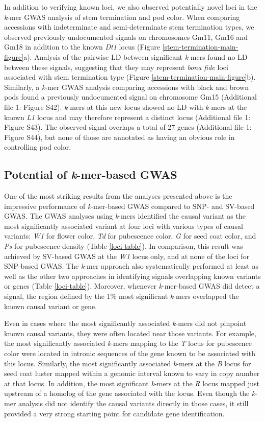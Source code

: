\documentclass[doublespacing]{bmcart}
\begin{document}
In addition to verifying known loci, we also observed potentially novel loci in
the \textit{k}-mer GWAS analysis of stem termination and pod color.  When
comparing accessions with indeterminate and semi-determinate stem termination
types, we observed previously undocumented signals on chromosomes Gm11, Gm16
and Gm18 in addition to the known \textit{Dt1} locus (Figure
\ref{stem-termination-main-figure}a).  Analysis of the pairwise LD between
significant \textit{k}-mers found no LD between these signals, suggesting that
they may represent \textit{bona fide} loci associated with stem termination
type (Figure \ref{stem-termination-main-figure}b). Similarly, a \textit{k}-mer
GWAS analysis comparing accessions with black and brown pods found a previously
undocumented signal on chromosome Gm15 (Additional file 1: Figure S42).
\textit{k}-mers at this new locus
showed no LD with \textit{k}-mers at the known \textit{L1} locus and may
therefore represent a distinct locus (Additional file 1: Figure 
S43). The observed signal overlaps a total of 27 genes
(Additional file 1: Figure S44), but none of those are annotated
as having an obvious role in controlling pod color.

\subsection*{Potential of \emph{k}-mer-based GWAS}

One of the most striking results from the analyses presented above is the
impressive performance of \emph{k}-mer-based GWAS compared to SNP- and SV-based
GWAS. The GWAS analyses using \emph{k}-mers identified the causal variant as
the most significantly associated variant at four loci with various types of
causal variants: \emph{W1} for flower color, \emph{Td} for pubescence color,
\emph{G} for seed coat color, and \emph{Ps} for pubescence density (Table
\ref{loci-table}). In comparison, this result was achieved by SV-based GWAS at
the \textit{W1} locus only, and at none of the loci for SNP-based GWAS.
The \textit{k}-mer approach also systematically performed at least as well as
the other two approaches in identifying signals overlapping known variants or
genes (Table \ref{loci-table}). Moreover, whenever \textit{k}-mer-based GWAS
did detect a signal, the region defined by the 1\% most significant
\textit{k}-mers overlapped the known causal variant or gene. 

Even in cases where the most significantly associated \emph{k}-mers did not
pinpoint known causal variants, they were often located near those variants.
For example, the most significantly associated \emph{k}-mers mapping to the
\emph{T} locus for pubescence color were located in intronic sequences of the
gene known to be associated with this locus.  Similarly, the most significantly
associated \emph{k}-mers at the \emph{B} locus for seed coat luster mapped
within a genomic interval known to vary in copy number at that locus. In
addition, the most significant \emph{k}-mers at the \emph{R} locus mapped just
upstream of a homolog of the gene associated with the locus. Even though the
\emph{k}-mer analysis did not identify the causal variants directly in those
cases, it still provided a very strong starting point for candidate gene
identification.
\end{document}
